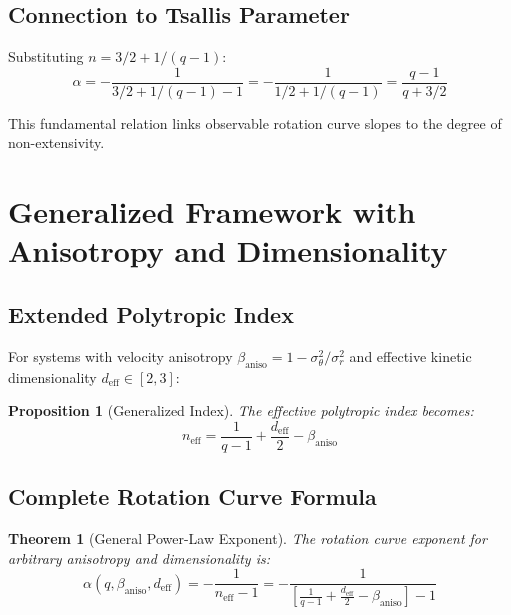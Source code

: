 \documentclass[12pt, a4paper]{article}
\newtheorem{theorem}{Theorem}
\newtheorem{proposition}{Proposition}
\theoremstyle{definition}
\theoremstyle{remark}
\begin{document}
\subsection{Connection to Tsallis Parameter}

Substituting $n = 3/2 + 1/(q-1)$:
\begin{equation}
\alpha = -\frac{1}{3/2 + 1/(q-1) - 1} = -\frac{1}{1/2 + 1/(q-1)} = \boxed{\frac{q-1}{q+3/2}}
\end{equation}

This fundamental relation links observable rotation curve slopes to the degree of non-extensivity.

\section{Generalized Framework with Anisotropy and Dimensionality}

\subsection{Extended Polytropic Index}

For systems with velocity anisotropy $\beta_{\text{aniso}} = 1 - \sigma_\theta^2/\sigma_r^2$ and effective kinetic dimensionality $d_{\text{eff}} \in [2,3]$:

\begin{proposition}[Generalized Index]
The effective polytropic index becomes:
\begin{equation}
n_{\text{eff}} = \frac{1}{q-1} + \frac{d_{\text{eff}}}{2} - \beta_{\text{aniso}}
\end{equation}
\end{proposition}

\subsection{Complete Rotation Curve Formula}

\begin{theorem}[General Power-Law Exponent]
The rotation curve exponent for arbitrary anisotropy and dimensionality is:
\begin{equation}
\boxed{\alpha(q, \beta_{\text{aniso}}, d_{\text{eff}}) = -\frac{1}{n_{\text{eff}} - 1} = -\frac{1}{\left[\frac{1}{q-1} + \frac{d_{\text{eff}}}{2} - \beta_{\text{aniso}}\right] - 1}}
\end{equation}
\end{theorem}
\end{document}
